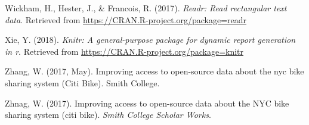 \documentclass[12pt,twoside]{reedthesis}
\theoremstyle{definition}
\theoremstyle{definition}
\theoremstyle{definition}
\theoremstyle{remark}
\begin{document}
\hypertarget{ref-pkgreadr}{}
Wickham, H., Hester, J., \& Francois, R. (2017). \emph{Readr: Read
rectangular text data}. Retrieved from
\url{https://CRAN.R-project.org/package=readr}

\hypertarget{ref-pkgknitr}{}
Xie, Y. (2018). \emph{Knitr: A general-purpose package for dynamic
report generation in r}. Retrieved from
\url{https://CRAN.R-project.org/package=knitr}

\hypertarget{ref-zhang2017}{}
Zhang, W. (2017, May). Improving access to open-source data about the
nyc bike sharing system (Citi Bike). Smith College.

\hypertarget{ref-vega2017}{}
Zhnag, W. (2017). Improving access to open-source data about the NYC
bike sharing system (citi bike). \emph{Smith College Scholar Works}.


\end{document}
